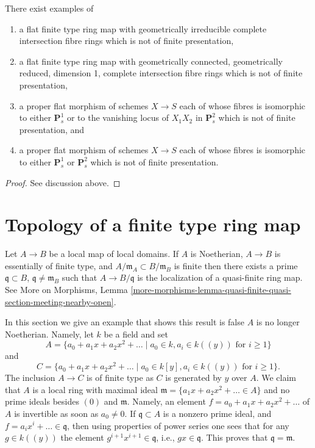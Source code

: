 \begin{lemma}
\label{lemma-finite-type-flat-not-finitely-presented}
There exist examples of
\begin{enumerate}
\item a flat finite type ring map with geometrically irreducible
complete intersection fibre rings which is not of finite presentation,
\item a flat finite type ring map with geometrically connected,
geometrically reduced, dimension 1, complete intersection fibre rings
which is not of finite presentation,
\item a proper flat morphism of schemes $X \to S$ each of whose fibres
is isomorphic to either $\mathbf{P}^1_s$ or to the vanishing locus of
$X_1X_2$ in $\mathbf{P}^2_s$ which is not of finite presentation, and
\item a proper flat morphism of schemes $X \to S$ each of whose
fibres is isomorphic to either $\mathbf{P}^1_s$ or $\mathbf{P}^2_s$
which is not of finite presentation.
\end{enumerate}
\end{lemma}

\begin{proof}
See discussion above.
\end{proof}



\section{Topology of a finite type ring map}
\label{section-topology-finite-type}

\noindent
Let $A \to B$ be a local map of local domains.
If $A$ is Noetherian, $A \to B$ is essentially of finite type,
and $A/\mathfrak m_A \subset B/\mathfrak m_B$ is finite then there
exists a prime $\mathfrak q \subset B$, $\mathfrak q \not = \mathfrak m_B$
such that $A \to B/\mathfrak q$ is the localization of a quasi-finite ring
map. See
More on Morphisms, Lemma
\ref{more-morphisms-lemma-quasi-finite-quasi-section-meeting-nearby-open}.

\medskip\noindent
In this section we give an example that shows this result is false $A$
is no longer Noetherian. Namely, let $k$ be a field and set
$$
A = \{a_0 + a_1 x + a_2 x^2 + \ldots \mid a_0 \in k, a_i \in k((y))
\text{ for }i\geq 1\}
$$
and
$$
C = \{a_0 + a_1 x + a_2 x^2 + \ldots \mid a_0 \in k[y], a_i \in k((y))
\text{ for }i\geq 1\}.
$$
The inclusion $A \to C$ is of finite type as $C$ is generated by $y$
over $A$. We claim that $A$ is a local ring with maximal ideal
$\mathfrak m = \{a_1 x + a_2 x^2 + \ldots \in A\}$ and no prime
ideals besides $(0)$ and $\mathfrak m$. Namely, an element
$f = a_0 + a_1 x + a_2 x^2 + \ldots$ of $A$ is invertible as soon as
$a_0 \not = 0$. If $\mathfrak q \subset A$ is a nonzero prime ideal,
and $f = a_i x^i + \ldots \in \mathfrak q$, then using properties of
power series one sees that for any $g \in k((y))$ the element
$g^{i + 1} x^{i + 1} \in \mathfrak q$, i.e., $gx \in \mathfrak q$.
This proves that $\mathfrak q = \mathfrak m$.

